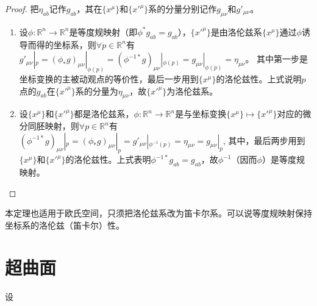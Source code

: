 \begin{proof}
把$\eta_{ab}$记作$g_{ab}$，其在$\{x^\mu\}$和$\{x'^\mu\}$系的分量分别记作$g_{\mu\nu}$和$g'_{\mu\nu}$。
\begin{enumerate}[（A）]
\item 设$\phi \colon \mathbb{R}^n \to \mathbb{R}^n$是等度规映射（即$\phi^*g_{ab} = g_{ab}$），$\{x'^\mu\}$是由洛伦兹系$\{x^\mu\}$通过$\phi$诱导而得的坐标系，则$\forall p \in \mathbb{R}^n$有
$g'_{\mu\nu}|_p = (\phi_*g)_{\mu\nu}|_{\phi(p)} = (\phi^{-1*}g)_{\mu\nu}|_{\phi(p)} = g_{\mu\nu}|_{\phi(p)} = \eta_{\mu\nu}$。
其中第一步是坐标变换的主被动观点的等价性，最后一步用到$\{x^\mu\}$的洛伦兹性。上式说明$p$点的$g_{ab}$在$\{x'^\mu\}$系的分量为$\eta_{\mu\nu}$，故$\{x'^\mu\}$为洛伦兹系。
\item 设$\{x^\mu\}$和$\{x'^\mu\}$都是洛伦兹系，$\phi \colon \mathbb{R}^n \to \mathbb{R}^n$是与坐标变换$\{x^\mu\} \mapsto \{x'^\mu\}$对应的微分同胚映射，则$\forall p \in \mathbb{R}^n$有
$(\phi^{-1*}g)_{\mu\nu}|_p = (\phi_*g)_{\mu\nu}|_p = g'_{\mu\nu}|_{\phi^{-1}(p)} = \eta_{\mu\nu} = g_{\mu\nu}|_p$,
其中，最后两步用到$\{x^\mu\}$和$\{x'^\mu\}$的洛伦兹性。上式表明$\phi^{-1*}g_{ab} = g_{ab}$，故$\phi^{-1}$（因而$\phi$）是等度规映射。
\end{enumerate}
\end{proof}

\begin{note}
本定理也适用于欧氏空间，只须把洛伦兹系改为笛卡尔系。可以说等度规映射保持坐标系的洛伦兹（笛卡尔）性。
\end{note}

\section{超曲面}

\begin{definition}
设
\end{definition}
